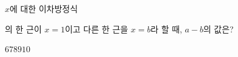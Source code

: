 $x$에 대한 이차방정식\par\smallskip{}\par\smallskip\noindent 의 한 근이 $x=1$이고 다른 한 근을 $x=b$라 할 때, $a-b$의 값은? 
\begin{choices32}{$6$}{$7$}{$8$}{$9$}{$10$}\end{choices32}
